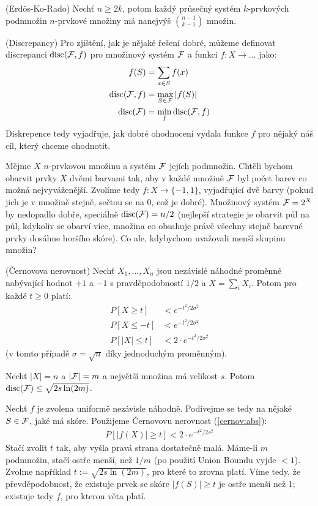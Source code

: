 \vt (Erdös-Ko-Rado) Nechť $n \geq 2k$, potom každý průsečný systém 
$k$-prvkových podmnožin $n$-prvkové množiny má nanejvýš $\binom{n-1}{k-1}$ 
množin.

\df (Discrepancy) Pro zjištění, jak je nějaké řešení dobré, můžeme definovat 
discrepanci $\operatorname{disc}(\mathcal{F},f)$ pro množinový systém $\mathcal{F}$ a funkci $f: X \to \dots$ 
jako:
\begin{align}
	f(S) &= \sum_{x\in S} f(x) \\
	\operatorname{disc}(\mathcal{F},f) &= \max_{S\in \mathcal{F}} |f(S)| \\
	\operatorname{disc}(\mathcal{F}) &= \min_f \operatorname{disc}(\mathcal{F},f)
\end{align}
Diskrepence tedy vyjadřuje, jak dobré ohodnocení vydala funkce $f$ pro nějaký 
náš cíl, který chceme ohodnotit.

\app Mějme $X$ $n$-prvkovou množinu a systém $\mathcal{F}$ jejích podmnožin. Chtěli 
bychom obarvit prvky $X$ dvěmi barvami tak, aby v každé množině $\mathcal{F}$ byl počet 
barev co možná nejvyváženější. Zvolíme tedy $f: X \to \{-1, 1\}$, vyjadřující 
dvě barvy (pokud jich je v množině stejně, sečtou se na 0, což je dobré).  
Množinový systém $\mathcal{F} = 2^X$ by nedopadlo dobře, speciálně $\operatorname{disc}(\mathcal{F}) = n/2$ 
(nejlepší strategie je obarvit půl na půl, kdykoliv se obarví více, množina co 
obsahuje právě všechny stejně barevné prvky dosáhne horšího skóre). Co ale, 
kdybychom uvažovali menší skupinu množin?

\tv (Černovova nerovnost) Nechť $X_1, \dots, X_n$ jsou nezávislé náhodné 
proměnné nabývající hodnot $+1$ a $-1$ s pravděpodobností $1/2$ a $X = \sum_i 
X_i$. Potom pro každé $t \geq 0$ platí:
\begin{align}
	P[X \geq t] &< e^{-t^2/2\sigma^2} \\
	P[X \leq -t] &< e^{-t^2/2\sigma^2}\\
	\label{cernov:abs} P[|X| \leq t] &< 2\cdot e^{-t^2/2\sigma^2}
\end{align}
(v tomto případě $\sigma = \sqrt{n}$ díky jednoduchým proměnným).


\tv Nechť $|X|=n$ a $|\mathcal{F}| = m$ a největší množina má velikost $s$.  Potom 
$\operatorname{disc}(\mathcal{F}) \leq \sqrt{2s\ln(2m)}$.

\dk Nechť $f$ je zvolena uniformě nezávisle náhodně. Podívejme se tedy na nějaké
$S \in \mathcal{F}$, jaké má skóre. Použijeme Černovovu nerovnost (\ref{cernov:abs}):
\begin{align}
	P[|f(X)| \geq t] < 2 \cdot e^{-t^2/2s^2}
\end{align}
Stačí zvolit $t$ tak, aby vyšla pravá strana dostatečně malá. Máme-li $m$ 
podmnožin, stačí ostře menší, než $1/m$ (po použití Union Boundu vyjde $< 1$).  
Zvolme například $t := \sqrt{2s\ln(2m)}$, pro které to zrovna platí. Víme tedy, 
že převděpodobnost, že existuje prvek se skóre $|f(S)| \geq t$ je ostře menší 
než 1; existuje tedy $f$, pro kterou věta platí.

